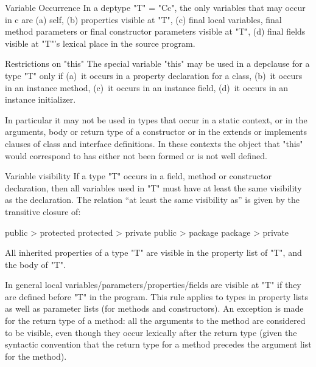 \begin{staticrule}{Variable Occurrence}
In a deptype \xcd"T" = \xcd"C{c}", the only variables that may occur in c are (a)
self, (b) properties visible at \xcd"T", (c) final local variables, final
method parameters or final constructor parameters visible at \xcd"T", (d)
final fields visible at \xcd"T"'s lexical place in the source program.  
\end{staticrule}

\begin{staticrule}{Restrictions on \xcd"this"}
  The special variable \xcd"this" may be used in a depclause for a type \xcd"T"
  only if (a)~it occurs in a property declaration for a class, (b)~it
  occurs in an instance method, (c)~it occurs in an instance field, (d)~it
  occurs in an instance initializer.
\end{staticrule}

In particular it may not be used in types that occur in a static
context, or in the arguments, body or return type of a constructor or
in the extends or implements clauses of class and interface
definitions.  In these contexts the object that \xcd"this" would
correspond to has either not been formed or is not well defined.

\begin{staticrule}{Variable visibility}
  If a type \xcd"T" occurs in a field, method or constructor
  declaration, then all variables used in \xcd"T" must have at least the
  same visibility as the declaration.  The relation ``at least the same
  visibility as'' is given by the transitive closure of:

  \begin{xten}
public    > protected
protected > private
public    > package
package   > private
  \end{xten}

All inherited properties of a type \xcd"T" are visible in the property
list of \xcd"T", and the body of \xcd"T".

\end{staticrule}

In general local variables/parameters/properties/fields are visible at
\xcd"T" if they are defined before \xcd"T" in the program. This rule applies to
types in property lists as well as parameter lists (for methods and
constructors).  An exception is made for the return type of a method:
all the arguments to the method are considered to be visible, even
though they occur lexically after the return type (given the \Java{}
syntactic convention that the return type for a method precedes the
argument list for the method).

